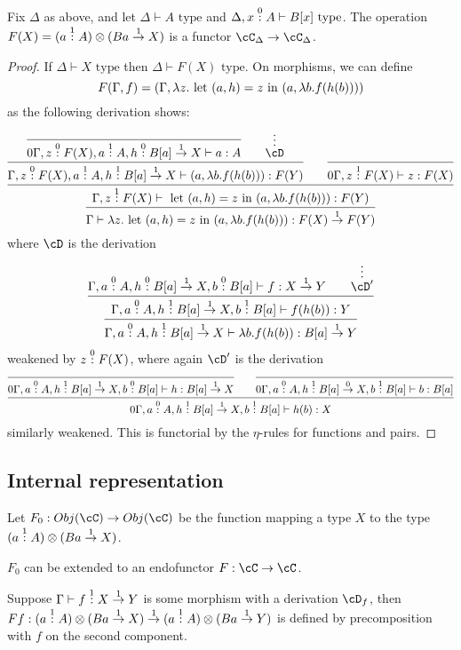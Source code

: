 \documentclass[12pt,a4paper]{article}
\begin{document}
\begin{lemma}
  Fix $\Delta$ as above, and let $\Delta \vdash A \text{ type}$ and $\Delta, x \overset{0}{:} A \vdash B[x] \text{ type}$. The operation $F(X) = (a \overset{1}{:} A) \otimes (Ba \overset{1}\to X)$ is a functor $\cC_\Delta \to \cC_\Delta$.
\end{lemma}
\begin{proof}
  If $\Delta \vdash X \text{ type}$ then $\Delta \vdash F(X) \text{ type}$. On morphisms, we can define
  \[
    F(\Gamma, f) = (\Gamma, \lambda z . \text{ let } (a, h) = z \text{ in } (a, \lambda b . f(h(b))))
  \]
  as the following derivation shows:
  \[
    \infer{\Gamma \vdash \lambda z . \letin{a, h}{z}{(a, \lambda b . f(h(b)))} : F(X) \ofto{1} F(Y)}
       {\infer{\Gamma, z \of{1} F(X) \vdash \letin{a, h}{z}{(a, \lambda b . f(h(b)))} : F(Y)}
          { \infer{\Gamma, z \of{0} F(X), a \of{1} A, h \of{1} B[a] \ofto{1} X \vdash (a, \lambda b . f(h(b))) : F(Y)}{\infer{0\Gamma, z \of{0} F(X), a \of{1} A, h \of{0} B[a] \ofto{1} X \vdash a : A}{} & \quad \deduce{\cD}{\vdots}} & \quad \infer{0\Gamma, z \of{1} F(X) \vdash z : F(X)}{}}}
      \]
      where $\cD$ is the derivation
      \[
                 {
            \infer{\Gamma, a \of{0} A, h \of{1} B[a] \ofto{1} X \vdash \lambda b . f(h(b)) : B[a] \ofto{1} Y}{ \infer{\Gamma, a \of{0} A, h \of{1} B[a] \ofto{1} X, b \of{1} B[a]  \vdash f(h(b)) : Y}{ {\Gamma, a \of{0} A, h \of{0} B[a] \ofto{1} X, b \of{0} B[a] \vdash f : X \ofto{1} Y} & \quad \deduce{\cD'}{\vdots} }} }
        \]
        weakened by $z \overset{0}{:} F(X)$, where again $\cD'$ is the derivation
        \[
\infer{0\Gamma, a \of{0} A, h \of{1} B[a] \ofto{1} X, b \of{1} B[a] \vdash h(b) : X}{\infer{0\Gamma, a \of{0} A, h \of{1} B[a] \ofto{1} X, b \of{0} B[a] \vdash h : B[a] \ofto{1} X}{} & \quad \infer{0\Gamma, a \of{0} A, h \of{1} B[a] \ofto{0} X, b \of{1} B[a] \vdash b : B[a]}{}}
\]
similarly weakened. This is functorial by the $\eta$-rules for functions and pairs.
\end{proof}


\subsection{Internal representation}
Let $F_0 : Obj(\cC) \to Obj(\cC) $ be the function mapping a type $X$ to the type $(a \overset{1}{:} A) \otimes (Ba \overset{1}{\to} X)$. 
\begin{claim}
  $F_0$ can be extended to an endofunctor $F : \cC \to \cC$.
\end{claim}
Suppose $\Gamma \vdash f \overset{1}{:} X \overset{1}{\to} Y$ is some morphism with a derivation $\cD_f$, then $Ff: (a \overset{1}{:} A) \otimes (Ba \overset{1}{\to} X) \overset{1}{\to} (a \overset{1}{:} A) \otimes (Ba \overset{1}{\to} Y)$ is defined by precomposition with $f$ on the second component.\\
\end{document}
